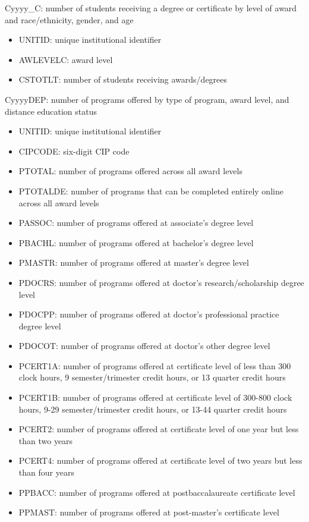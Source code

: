 \documentclass[sigconf, authorversion, nonacm]{acmart}
\begin{document}
    Cyyyy\_C: number of students receiving a degree or certificate by level of award and race/ethnicity, gender, and age

    \begin{itemize}
        \item UNITID: unique institutional identifier
        \item AWLEVELC: award level
        \item CSTOTLT: number of students receiving awards/degrees
    \end{itemize}

    CyyyyDEP: number of programs offered by type of program, award level, and distance education status

    \begin{itemize}
        \item UNITID: unique institutional identifier
        \item CIPCODE: six-digit CIP code
        \item PTOTAL: number of programs offered across all award levels
        \item PTOTALDE: number of programs that can be completed entirely online across all award levels
        \item PASSOC: number of programs offered at associate's degree level
        \item PBACHL: number of programs offered at bachelor's degree level
        \item PMASTR: number of programs offered at master's degree level
        \item PDOCRS: number of programs offered at doctor's research/scholarship degree level
        \item PDOCPP: number of programs offered at doctor's professional practice degree level
        \item PDOCOT: number of programs offered at doctor's other degree level
        \item PCERT1A: number of programs offered at certificate level of less than 300 clock hours, 9 semester/trimester credit hours, or 13 quarter credit hours
        \item PCERT1B: number of programs offered at certificate level of 300-800 clock hours, 9-29 semester/trimester credit hours, or 13-44 quarter credit hours
        \item PCERT2: number of programs offered at certificate level of one year but less than two years
        \item PCERT4: number of programs offered at certificate level of two years but less than four years
        \item PPBACC: number of programs offered at postbaccalaureate certificate level
        \item PPMAST: number of programs offered at post-master's certificate level
    \end{itemize}
\end{document}
